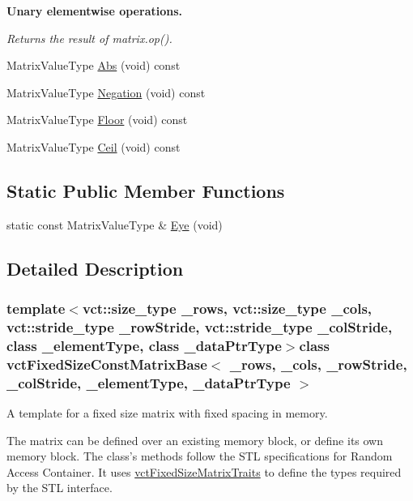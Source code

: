 \begin{Indent}{\bf Unary elementwise operations.}\par
{\em Returns the result of matrix.\-op(). }\begin{DoxyCompactItemize}
\item 
Matrix\-Value\-Type \hyperlink{classvct_fixed_size_const_matrix_base_adece2c517893f4390b4bdc01a373e694}{Abs} (void) const 
\item 
Matrix\-Value\-Type \hyperlink{classvct_fixed_size_const_matrix_base_a846a69adb8721a9ea7028592d445f97d}{Negation} (void) const 
\item 
Matrix\-Value\-Type \hyperlink{classvct_fixed_size_const_matrix_base_ad96f8a4475440a2dded7794deb1a7b0c}{Floor} (void) const 
\item 
Matrix\-Value\-Type \hyperlink{classvct_fixed_size_const_matrix_base_adf0ee227f5b408f08ab81c4ffd286d7b}{Ceil} (void) const 
\end{DoxyCompactItemize}
\end{Indent}
\subsection*{Static Public Member Functions}
\begin{DoxyCompactItemize}
\item 
static const Matrix\-Value\-Type \& \hyperlink{classvct_fixed_size_const_matrix_base_afc832f0fce11803913295c4059e407ef}{Eye} (void)
\end{DoxyCompactItemize}


\subsection{Detailed Description}
\subsubsection*{template$<$vct\-::size\-\_\-type \-\_\-rows, vct\-::size\-\_\-type \-\_\-cols, vct\-::stride\-\_\-type \-\_\-row\-Stride, vct\-::stride\-\_\-type \-\_\-col\-Stride, class \-\_\-element\-Type, class \-\_\-data\-Ptr\-Type$>$class vct\-Fixed\-Size\-Const\-Matrix\-Base$<$ \-\_\-rows, \-\_\-cols, \-\_\-row\-Stride, \-\_\-col\-Stride, \-\_\-element\-Type, \-\_\-data\-Ptr\-Type $>$}

A template for a fixed size matrix with fixed spacing in memory. 

The matrix can be defined over an existing memory block, or define its own memory block. The class's methods follow the S\-T\-L specifications for Random Access Container. It uses \hyperlink{classvct_fixed_size_matrix_traits}{vct\-Fixed\-Size\-Matrix\-Traits} to define the types required by the S\-T\-L interface.

